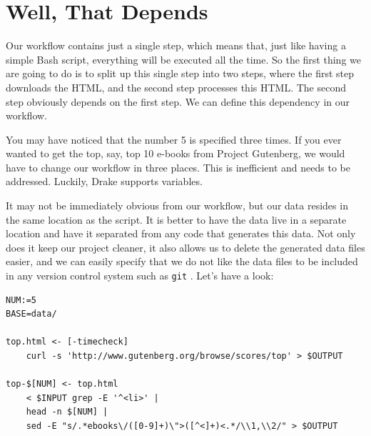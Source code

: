 \documentclass[
]{book}
\theoremstyle{definition}
\theoremstyle{definition}
\theoremstyle{definition}
\theoremstyle{remark}
\begin{document}
\hypertarget{well-that-depends}{%
\section{Well, That Depends}\label{well-that-depends}}

Our workflow contains just a single step, which means that, just like having a simple Bash script, everything will be executed all the time. So the first thing we are going to do is to split up this single step into two steps, where the first step downloads the HTML, and the second step processes this HTML. The second step obviously depends on the first step. We can define this dependency in our workflow.

You may have noticed that the number 5 is specified three times. If you ever wanted to get the top, say, top 10 e-books from Project Gutenberg, we would have to change our workflow in three places. This is inefficient and needs to be addressed. Luckily, Drake supports variables.

It may not be immediately obvious from our workflow, but our data resides in the same location as the script. It is better to have the data live in a separate location and have it separated from any code that generates this data. Not only does it keep our project cleaner, it also allows us to delete the generated data files easier, and we can easily specify that we do not like the data files to be included in any version control system such as \texttt{git} \citep{git}. Let's have a look:

\begin{verbatim}
NUM:=5                                                              
BASE=data/                                                          

top.html <- [-timecheck]
    curl -s 'http://www.gutenberg.org/browse/scores/top' > $OUTPUT  

top-$[NUM] <- top.html                                              
    < $INPUT grep -E '^<li>' |
    head -n $[NUM] |
    sed -E "s/.*ebooks\/([0-9]+)\">([^<]+)<.*/\\1,\\2/" > $OUTPUT
\end{verbatim}
\end{document}
